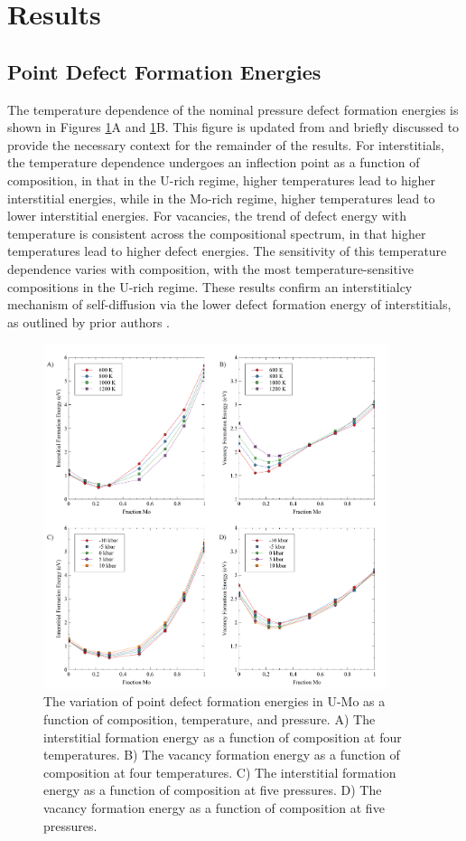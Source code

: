 \documentclass[review]{elsarticle}
\begin{document}
\section{Results}\label{sec3}
\subsection{Point Defect Formation Energies}

The temperature dependence of the nominal pressure defect formation energies is shown in Figures \ref{fig:A}A and \ref{fig:A}B. This figure is updated from \cite{beelerMRSadv} and briefly discussed to provide the necessary context for the remainder of the results. For interstitials, the temperature dependence undergoes an inflection point as a function of composition, in that in the U-rich regime, higher temperatures lead to higher interstitial energies, while in the Mo-rich regime, higher temperatures lead to lower interstitial energies. For vacancies, the trend of defect energy with temperature is consistent across the compositional spectrum, in that higher temperatures lead to higher defect energies. The sensitivity of this temperature dependence varies with composition, with the most temperature-sensitive compositions in the U-rich regime. These results confirm an interstitialcy mechanism of self-diffusion via the lower defect formation energy of interstitials, as outlined by prior authors \cite{park2021,starikov2018}. 

\begin{figure}[h!]
\centering
\includegraphics[width=0.9\textwidth]{figA.pdf}
\caption{The variation of point defect formation energies in U-Mo as a function of composition, temperature, and pressure. A) The interstitial formation energy as a function of composition at four temperatures. B) The vacancy formation energy as a function of composition at four temperatures. C) The interstitial formation energy as a function of composition at five pressures. D) The vacancy formation energy as a function of composition at five pressures.} 
\label{fig:A}
\end{figure}
\end{document}
